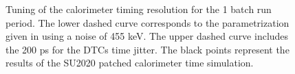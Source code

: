 \begin{figure}[h]
  \hspace{-0.6in}
  \caption{
    \label{fig:calorimeter_timing_resolution_1batch}
    Tuning of {\blue the} calorimeter timing resolution for the 1 batch run period. The lower dashed curve corresponds to the parametrization given in 
    \cite{MU2E_36225_CALO_TIME_RES}  {\blue using} a noise of 455 keV. The upper dashed curve includes the 200 ps for the DTCs time 
     {\blue jitter}. The black points represent the result{\blue s} of the SU2020 patched calorimeter time simulation.
  }
\end{figure}

